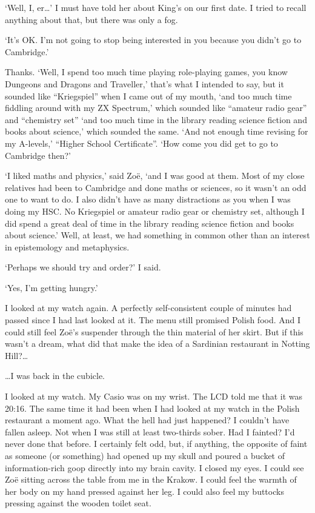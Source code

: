 `Well, I, er\dots' I must have told her about King's on our first date. I tried to recall anything about that, but there was only a fog.

`It's OK. I'm not going to stop being interested in you because you
didn't go to Cambridge.'

Thanks. `Well, I spend too much time playing role-playing games, you know {\twelvesl Dungeons and
Dragons\/} and {\twelvesl Traveller},' that's what I intended to say, but it sounded like
``Kriegspiel'' when I came out of my mouth, `and too much time
fiddling around with my ZX Spectrum,' which sounded like ``amateur radio gear'' and ``chemistry set'' `and too much time in the library reading science fiction and books about science,' which sounded the same. `And not enough time revising for my A-levels,' ``Higher School Certificate''. `How come you {\twelveit did\/} get to go to Cambridge then?'

`I liked maths and physics,' said Zoë, `and I was good at them. Most of my close relatives had been to Cambridge and done maths or sciences, so it wasn't an odd one to want to do. I also didn't have as many distractions as you when I was doing my HSC. No Kriegspiel or amateur radio gear or chemistry set, although I did spend a great deal of time in the library reading science fiction and books about science.' Well, at least, we had something in common other than an interest in epistemology and metaphysics.

`Perhaps we should try and order?' I said.

`Yes, I'm getting hungry.'

I looked at my watch again. A perfectly self-consistent couple of minutes had passed since I had last looked at it. The menu still promised Polish food. And I could still feel Zoë's suspender through the thin material of her skirt.
But if this wasn't a dream, what did that make the idea of a Sardinian restaurant in Notting Hill?\dots

\vskip 1cm

{\parindent=0pt
{\dots}I was back in the cubicle.}

I looked at my watch. My Casio was on my wrist. The LCD told me that it was 20:16. The same time it had been when I had looked at my watch in the Polish restaurant a moment ago. What the hell had just happened? I couldn't have fallen asleep. Not when I was
still at least two-thirds sober. Had I fainted? I'd
never done that before. I certainly felt odd, but, if anything, the
opposite of faint as someone (or something) had opened up my skull
and poured a bucket of information-rich goop directly into my brain
cavity. I closed my eyes. I could see Zoë sitting across the table from me in the Krakow. I could feel the warmth of her body on my hand pressed against her leg. I could also feel my buttocks
pressing against the wooden toilet seat.


